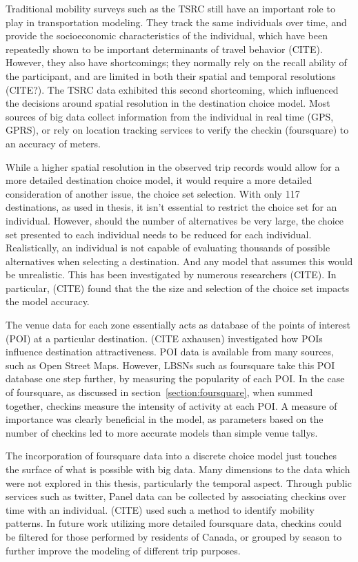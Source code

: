 Traditional mobility surveys such as the TSRC still have an important role to play in transportation modeling. They track the same individuals over time, and provide the socioeconomic characteristics of the individual, which have been repeatedly shown to be important determinants of travel behavior (CITE). However, they also have shortcomings; they normally rely on the recall ability of the participant, and are limited in both their spatial and temporal resolutions (CITE?). The TSRC data exhibited this second shortcoming, which influenced the decisions around spatial resolution in the destination choice model. Most sources of big data collect information from the individual in real time (GPS, GPRS), or rely on location tracking services to verify the checkin (foursquare) to an accuracy of meters.

While a higher spatial resolution in the observed trip records would allow for a more detailed destination choice model, it would require a more detailed consideration of another issue, the choice set selection. With only 117 destinations, as used in thesis, it isn't essential to restrict the choice set for an individual. However, should the number of alternatives be very large, the choice set presented to each individual needs to be reduced for each individual. Realistically, an individual is not capable of evaluating thousands of possible alternatives when selecting a destination. And any model that assumes this would be unrealistic. This has been investigated by numerous researchers (CITE). In particular, (CITE) found that the the size and selection of the choice set impacts the model accuracy.

The venue data for each zone essentially acts as database of the points of interest (POI) at a particular destination. (CITE axhausen) investigated how POIs influence destination attractiveness. POI data is available from many sources, such as Open Street Maps. However, LBSNs such as foursquare take this POI database one step further, by measuring the popularity of each POI. In the case of foursquare, as discussed in section~\ref{section:foursquare}, when summed together, checkins measure the intensity of activity at each POI. A measure of importance was clearly beneficial in the model, as parameters based on the number of checkins led to more accurate models than simple venue tallys.

The incorporation of foursquare data into a discrete choice model just touches the surface of what is possible with big data. 
Many dimensions to the data which were not explored in this thesis,  particularly the temporal aspect. Through public services such as twitter, Panel data can be collected by associating checkins over time with an individual. (CITE) used such a method to identify mobility patterns. In future work utilizing more detailed foursquare data, checkins could be filtered for those performed by residents of Canada, or grouped by season to further improve the modeling of different trip purposes.

